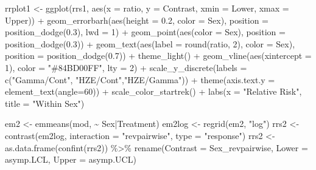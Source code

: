 \documentclass[12pt]{article}
\newenvironment{Shaded}{\begin{snugshade}}{\end{snugshade}}
\newcommand{\AttributeTok}[1]{\textcolor[rgb]{0.77,0.63,0.00}{#1}}
\newcommand{\DecValTok}[1]{\textcolor[rgb]{0.00,0.00,0.81}{#1}}
\newcommand{\FloatTok}[1]{\textcolor[rgb]{0.00,0.00,0.81}{#1}}
\newcommand{\FunctionTok}[1]{\textcolor[rgb]{0.00,0.00,0.00}{#1}}
\newcommand{\NormalTok}[1]{#1}
\newcommand{\OtherTok}[1]{\textcolor[rgb]{0.56,0.35,0.01}{#1}}
\newcommand{\SpecialCharTok}[1]{\textcolor[rgb]{0.00,0.00,0.00}{#1}}
\newcommand{\StringTok}[1]{\textcolor[rgb]{0.31,0.60,0.02}{#1}}
\begin{document}
\begin{Shaded}
\begin{Highlighting}[]
\NormalTok{rrplot1 }\OtherTok{\textless{}{-}} \FunctionTok{ggplot}\NormalTok{(rrs1, }\FunctionTok{aes}\NormalTok{(}\AttributeTok{x =}\NormalTok{ ratio, }\AttributeTok{y =}\NormalTok{ Contrast, }\AttributeTok{xmin =}\NormalTok{ Lower, }\AttributeTok{xmax =}\NormalTok{ Upper)) }\SpecialCharTok{+}
  \FunctionTok{geom\_errorbarh}\NormalTok{(}\FunctionTok{aes}\NormalTok{(}\AttributeTok{height =} \FloatTok{0.2}\NormalTok{, }\AttributeTok{color =}\NormalTok{ Sex),}
                 \AttributeTok{position =} \FunctionTok{position\_dodge}\NormalTok{(}\FloatTok{0.3}\NormalTok{), }\AttributeTok{lwd =} \DecValTok{1}\NormalTok{) }\SpecialCharTok{+}
  \FunctionTok{geom\_point}\NormalTok{(}\FunctionTok{aes}\NormalTok{(}\AttributeTok{color =}\NormalTok{ Sex), }\AttributeTok{position =} \FunctionTok{position\_dodge}\NormalTok{(}\FloatTok{0.3}\NormalTok{)) }\SpecialCharTok{+}
  \FunctionTok{geom\_text}\NormalTok{(}\FunctionTok{aes}\NormalTok{(}\AttributeTok{label =} \FunctionTok{round}\NormalTok{(ratio, }\DecValTok{2}\NormalTok{), }\AttributeTok{color =}\NormalTok{ Sex), }
            \AttributeTok{position =} \FunctionTok{position\_dodge}\NormalTok{(}\FloatTok{0.7}\NormalTok{)) }\SpecialCharTok{+}
  \FunctionTok{theme\_light}\NormalTok{() }\SpecialCharTok{+}
  \FunctionTok{geom\_vline}\NormalTok{(}\FunctionTok{aes}\NormalTok{(}\AttributeTok{xintercept =} \DecValTok{1}\NormalTok{), }\AttributeTok{color =} \StringTok{"\#84BD00FF"}\NormalTok{, }\AttributeTok{lty =} \DecValTok{2}\NormalTok{) }\SpecialCharTok{+}
  \FunctionTok{scale\_y\_discrete}\NormalTok{(}\AttributeTok{labels =} \FunctionTok{c}\NormalTok{(}\StringTok{"Gamma/Cont"}\NormalTok{, }\StringTok{"HZE/Cont"}\NormalTok{,}\StringTok{"HZE/Gamma"}\NormalTok{)) }\SpecialCharTok{+} 
  \FunctionTok{theme}\NormalTok{(}\AttributeTok{axis.text.y =} \FunctionTok{element\_text}\NormalTok{(}\AttributeTok{angle=}\DecValTok{60}\NormalTok{)) }\SpecialCharTok{+}
  \FunctionTok{scale\_color\_startrek}\NormalTok{() }\SpecialCharTok{+}
  \FunctionTok{labs}\NormalTok{(}\AttributeTok{x =} \StringTok{"Relative Risk"}\NormalTok{,}
       \AttributeTok{title =} \StringTok{"Within Sex"}\NormalTok{)}

\NormalTok{em2 }\OtherTok{\textless{}{-}} \FunctionTok{emmeans}\NormalTok{(mod, }\SpecialCharTok{\textasciitilde{}}\NormalTok{ Sex}\SpecialCharTok{|}\NormalTok{Treatment)}
\NormalTok{em2log }\OtherTok{\textless{}{-}} \FunctionTok{regrid}\NormalTok{(em2, }\StringTok{"log"}\NormalTok{)}
\NormalTok{rrs2 }\OtherTok{\textless{}{-}} \FunctionTok{contrast}\NormalTok{(em2log, }\AttributeTok{interaction =} \StringTok{"revpairwise"}\NormalTok{, }\AttributeTok{type =} \StringTok{"response"}\NormalTok{)}
\NormalTok{rrs2 }\OtherTok{\textless{}{-}} \FunctionTok{as.data.frame}\NormalTok{(}\FunctionTok{confint}\NormalTok{(rrs2)) }\SpecialCharTok{\%\textgreater{}\%}
  \FunctionTok{rename}\NormalTok{(}\AttributeTok{Contrast =}\NormalTok{ Sex\_revpairwise, }\AttributeTok{Lower =}\NormalTok{ asymp.LCL, }\AttributeTok{Upper =}\NormalTok{ asymp.UCL)}


\end{Highlighting}
\end{Shaded}
\end{document}
